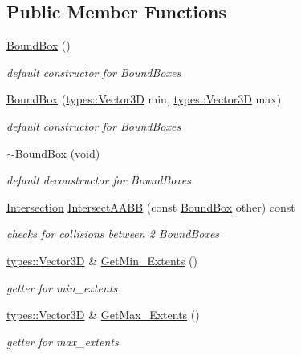 \subsection*{Public Member Functions}
\begin{DoxyCompactItemize}
\item 
\hyperlink{class_bound_box_abff45f0f385e01b9e19d0dd34cbf4782}{Bound\+Box} ()
\begin{DoxyCompactList}\small\item\em default constructor for Bound\+Boxes \end{DoxyCompactList}\item 
\hyperlink{class_bound_box_ab77908827bd99df33163d2e9baa9d44d}{Bound\+Box} (\hyperlink{structtypes_1_1_vector3_d}{types\+::\+Vector3\+D} min, \hyperlink{structtypes_1_1_vector3_d}{types\+::\+Vector3\+D} max)
\begin{DoxyCompactList}\small\item\em default constructor for Bound\+Boxes \end{DoxyCompactList}\item 
\hyperlink{class_bound_box_a3c4f00ec4a85363475b8b0f5b741630e}{$\sim$\+Bound\+Box} (void)
\begin{DoxyCompactList}\small\item\em default deconstructor for Bound\+Boxes \end{DoxyCompactList}\item 
\hyperlink{class_intersection}{Intersection} \hyperlink{class_bound_box_ad1d249ab937cee6de313f1786f9d8b4f}{Intersect\+A\+A\+B\+B} (const \hyperlink{class_bound_box}{Bound\+Box} other) const 
\begin{DoxyCompactList}\small\item\em checks for collisions between 2 Bound\+Boxes \end{DoxyCompactList}\item 
\hyperlink{structtypes_1_1_vector3_d}{types\+::\+Vector3\+D} \& \hyperlink{class_bound_box_a9d26c2d8bf3d5fbc51c5a1c8e2a08e26}{Get\+Min\+\_\+\+Extents} ()
\begin{DoxyCompactList}\small\item\em getter for min\+\_\+extents \end{DoxyCompactList}\item 
\hyperlink{structtypes_1_1_vector3_d}{types\+::\+Vector3\+D} \& \hyperlink{class_bound_box_a934a485c45257f935d2ed001e494fb63}{Get\+Max\+\_\+\+Extents} ()
\begin{DoxyCompactList}\small\item\em getter for max\+\_\+extents \end{DoxyCompactList}\item 

\end{DoxyCompactItemize}
